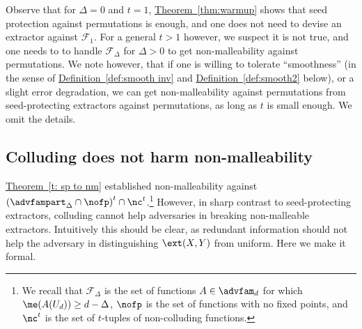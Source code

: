 \documentclass[11pt]{article}
\numberwithin{equation}{section}
\theoremstyle{definition}
\theoremstyle{plain}
\newcommand{\expref}[2]{\hyperref[#2]{#1~\ref{#2}}}
\begin{document}
Observe that for $\Delta = 0$ and $t = 1$, \expref{Theorem}{thm:warmup} shows that seed protection against
permutations is enough, and one does not need to devise an extractor against $\mathcal{F}_1$.
For a general $t > 1$ however, we suspect it is not true, and one needs to to handle $\mathcal{F}_\Delta$
for $\Delta > 0$ to get non-malleability against permutations. We note however, that if one is willing
to tolerate ``smoothness'' (in the sense of \expref{Definition}{def:smooth inv} and \expref{Definition}{def:smooth2} below), or a slight
error degradation, we can get non-malleability against permutations from seed-protecting extractors
against permutations, as long as $t$ is small enough. We omit the details.

\subsection{Colluding does not harm non-malleability}\label{sec:no nc}

\expref{Theorem}{t: sp to nm} established non-malleability against $\left(\advfampart_{\Delta} \cap \nofp\right)^t \cap \nc^t$.\footnote{We recall that $\mathcal{F}_{\Delta}$ is the set of functions $A \in \advfam_d$ for which $\me(A(U_d)) \ge d-\Delta$, $\nofp$ is the set of functions with no fixed points, and $\nc^t$ is
the set of $t$-tuples of non-colluding functions.}
However, in sharp contrast to seed-protecting extractors, colluding cannot help
adversaries in breaking non-malleable extractors. Intuitively this should be clear, as
redundant information should not help the adversary in distinguishing $\ext(X,Y)$
from uniform. Here we make it formal.
\end{document}

